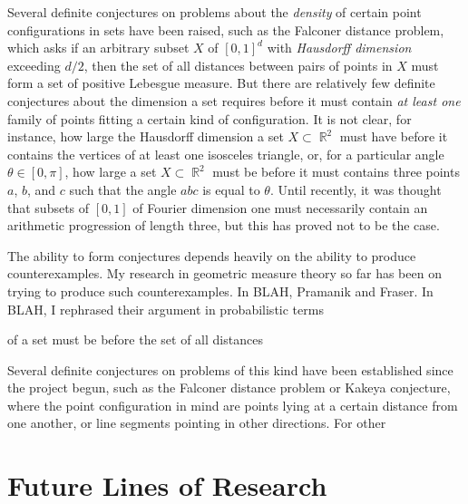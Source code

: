 \documentclass[12pt]{article}
\DeclareMathOperator{\RR}{\mathbb{R}}
\begin{document}
Several definite conjectures on problems about the \emph{density} of certain point configurations in sets have been raised, such as the Falconer distance problem, which asks if an arbitrary subset $X$ of $[0,1]^d$ with \emph{Hausdorff dimension} exceeding $d/2$, then the set of all distances between pairs of points in $X$ must form a set of positive Lebesgue measure. But there are relatively few definite conjectures about the dimension a set requires before it must contain \emph{at least one} family of points fitting a certain kind of configuration. It is not clear, for instance, how large the Hausdorff dimension a set $X \subset \RR^2$ must have before it contains the vertices of at least one isosceles triangle, or, for a particular angle $\theta \in [0,\pi]$, how large a set $X \subset \RR^2$ must be before it must contains three points $a$, $b$, and $c$ such that the angle $abc$ is equal to $\theta$. Until recently, it was thought that subsets of $[0,1]$ of Fourier dimension one must necessarily contain an arithmetic progression of length three, but this has proved not to be the case.

The ability to form conjectures depends heavily on the ability to produce counterexamples. My research in geometric measure theory so far has been on trying to produce such counterexamples. In BLAH, Pramanik and Fraser. In BLAH, I rephrased their argument in probabilistic terms 

 of a set must be before the set of all distances 

Several definite conjectures on problems of this kind have been established since the project begun, such as the Falconer distance problem or Kakeya conjecture, where the point configuration in mind are points lying at a certain distance from one another, or line segments pointing in other directions. For other

\section*{Future Lines of Research}
\end{document}
